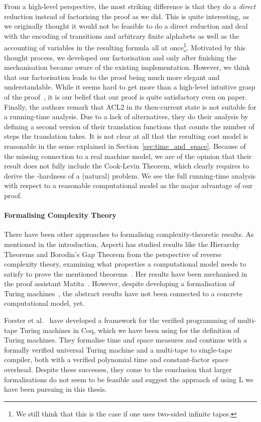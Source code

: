 From a high-level perspective, the most striking difference is that they do a \textit{direct} reduction instead of factorising the proof as we did. This is quite interesting, as we originally thought it would not be feasible to do a direct reduction and deal with the encoding of transitions and arbitrary finite alphabets as well as the accounting of variables in the resulting formula all at once\footnote{We still think that this is the case if one uses two-sided infinite tapes.}. Motivated by this thought process, we developed our factorisation and only after finishing the mechanisation became aware of the existing implementation.
However, we think that our factorisation leads to the proof being much more elegant and understandable. While it seems hard to get more than a high-level intuitive grasp of the proof~\cite{gamboa:cook}, it is our belief that our proof is quite satisfactory even on paper.
Finally, the authors remark that ACL2 in its then-current state is not suitable for a running-time analysis. Due to a lack of alternatives, they do their analysis by defining a second version of their translation functions that counts the number of steps the translation takes. It is not clear at all that the resulting cost model is reasonable in the sense explained in Section~\ref{sec:time_and_space}.
Because of the missing connection to a real machine model, we are of the opinion that their result does not fully include the Cook-Levin Theorem, which clearly requires to derive the \NP{}-hardness of a (natural) problem.
We see the full running-time analysis with respect to a reasonable computational model as the major advantage of our proof.

\paragraph{Formalising Complexity Theory}
There have been other approaches to formalising complexity-theoretic results. As mentioned in the introduction, Asperti has studied results like the Hierarchy Theorems and Borodin's Gap Theorem from the perspective of reverse complexity theory, examining what properties a computational model needs to satisfy to prove the mentioned theorems~\cite{asperti:reverse_complexity, asperti:borodin}. Her results have been mechanised in the proof assistant Matita~\cite{matita_web}. However, despite developing a formalisation of Turing machines~\cite{asperti_ricciotti}, the abstract results have not been connected to a concrete computational model, yet.

Forster et al.~\cite{ForsterEtAl:2019:VerifiedTMs} have developed a framework for the verified programming of multi-tape Turing machines in Coq, which we have been using for the definition of Turing machines. They formalise time and space measures and continue with a formally verified universal Turing machine and a multi-tape to single-tape compiler, both with a verified polynomial time and constant-factor space overhead. Despite these successes, they come to the conclusion that larger formalisations do not seem to be feasible and suggest the approach of using L we have been pursuing in this thesis.

